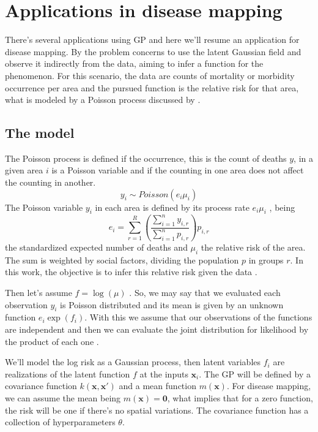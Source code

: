 \section{Applications in disease mapping}
There's several applications using GP and here we'll resume an application for disease mapping. By \cite{Vanhatalo2010Vehtari} the problem concerns to use the latent Gaussian field and observe it indirectly from the data, aiming to infer a function for the phenomenon. For this scenario, the data are counts of mortality or morbidity occurrence per area and the pursued function is the relative risk for that area, what is modeled by a Poisson process discussed by \cite{Best2005}.

\subsection{The model}

The Poisson process is defined if the occurrence, this is the count of deaths $y$, in a given area $i$ is a Poisson variable and if the counting in one area does not affect the counting in another. 
%
\begin{equation}
    y_i \sim Poisson(e_i\mu_i)
    \label{eq:observation-model}
\end{equation}
%
The Poisson variable $y_i$ in each area is defined by its process rate $e_i\mu_i$ \cite{Best2005,Samat2012}, being 
%
\begin{equation}
    e_{i}=\sum_{r=1}^{R}\left(\frac{\sum_{i=1}^{n} y_{i, r}}{\sum_{i=1}^{n} p_{i, r}}\right) p_{i, r}
    \label{eq:standized-num-death}
\end{equation}
%
the standardized expected number of deaths and $\mu_i$ the relative risk of the area. The sum is weighted by social factors, dividing the population $p$ in groups $r$.  In this work, the objective is to infer this relative risk given the data \cite{lawson2013statistical}. 

Then let's assume $f=\log (\mu)$ \cite{Best2005}. So, we may say that we evaluated each observation $y_i$ is Poisson distributed and its mean is given by an unknown function $e_i \exp(f_i)$. With this we assume that our observations of the functions are independent and then we can evaluate the joint distribution for likelihood by the product of each one \cite{jarno2010}.

We'll model the log risk as a Gaussian process, then latent variables $f_i$ are realizations of the latent function $f$ at the inputs $\mathbf{x}_i$. The GP will be defined by a covariance function $k(\mathbf{x},\mathbf{x}')$ and a mean function $m(\mathbf{x})$. For disease mapping, we can assume the mean being $m(\mathbf{x})=\mathbf{0}$, what implies that for a zero function, the risk will be one if there's no spatial variations. The covariance function has a collection of hyperparameters $\theta$.

